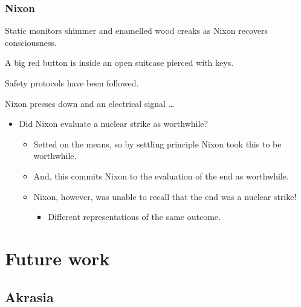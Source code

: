 \documentclass[noamssymb,
]{beamer} %
\newcommand{\hozlinedash}[0]{%
  \noindent\hdashrule[0.5ex][c]{\textwidth}{.1pt}{2.5pt}
}
\begin{document}
 \begin{frame}
  \frametitle{Nixon}

  {\rmfamily
    Static monitors shimmer and enamelled wood creaks as Nixon recovers consciousness.

    A big red button is inside an open suitcase pierced with keys.

    Safety protocols have been followed.

    Nixon presses down and an electrical signal \dots
  }

  \pause
  \hozlinedash

  \begin{itemize}
  \item<+-> Did Nixon evaluate a nuclear strike as worthwhile?
    \begin{itemize}
    \item<+-> Setted on the means, so by settling principle Nixon took this to be worthwhile.
    \item<+-> And, this commits Nixon to the evaluation of the end as worthwhile.
    \item<+-> Nixon, however, was unable to recall that the end was a nuclear strike!
      \begin{itemize}
      \item<+-> Different representations of the same outcome.
      \end{itemize}
    \end{itemize}
  \end{itemize}
\end{frame}



\section{Future work}
\label{sec:future-work}


\subsection{Akrasia}
\label{sec:akrasia}
\end{document}
